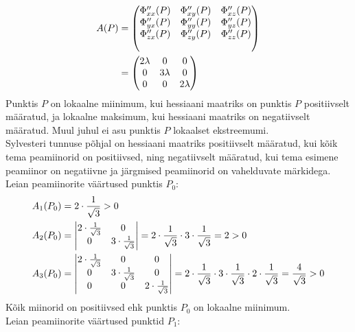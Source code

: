 \documentclass{article}
\begin{document}
\begin{align}
A(P)&=\begin{pmatrix}
\Phi_{xx}''(P) & \Phi_{xy}''(P) & \Phi_{xz}''(P)\\
\Phi_{yx}''(P) & \Phi_{yy}''(P) & \Phi_{yz}''(P)\\
\Phi_{zx}''(P) & \Phi_{zy}''(P) & \Phi_{zz}''(P)\\\notag
\end{pmatrix}\\
&=\begin{pmatrix}
2\lambda & 0 & 0\\
0 & 3\lambda & 0\\
0 & 0 & 2\lambda\notag
\end{pmatrix}
\end{align}
Punktis $P$ on lokaalne miinimum, kui hessiaani maatriks on punktis $P$ positiivselt määratud, ja lokaalne maksimum, kui hessiaani maatriks on negatiivselt määratud. Muul juhul ei asu punktis $P$ lokaalset ekstreemumi.\\
Sylvesteri tunnuse põhjal on hessiaani maatriks positiivselt määratud, kui kõik tema peamiinorid on positiivsed, ning negatiivselt määratud, kui tema esimene peamiinor on negatiivne ja järgmised peamiinorid on vahelduvate märkidega.
Leian peamiinorite väärtused punktis $P_0$:
\begin{align}
A_1(P_0)&= 2\cdot\frac{1}{\sqrt{3}}>0\notag\\
A_2(P_0)&=\begin{vmatrix}
2\cdot\frac{1}{\sqrt{3}} & 0\\
0 & 3\cdot\frac{1}{\sqrt{3}}\notag
\end{vmatrix}=2\cdot\frac{1}{\sqrt{3}}\cdot3\cdot\frac{1}{\sqrt{3}}=2>0\\
A_3(P_0)&=\begin{vmatrix}
2\cdot\frac{1}{\sqrt{3}} & 0 & 0\\
0 & 3\cdot\frac{1}{\sqrt{3}} & 0\\
0 & 0 & 2\cdot\frac{1}{\sqrt{3}}\notag
\end{vmatrix}=2\cdot\frac{1}{\sqrt{3}}\cdot3\cdot\frac{1}{\sqrt{3}}\cdot2\cdot\frac{1}{\sqrt{3}}=\frac{4}{\sqrt{3}}>0
\end{align}
Kõik miinorid on positiivsed ehk punktis $P_0$ on lokaalne miinimum.\\
Leian peamiinorite väärtused punktid $P_1$:
\end{document}
